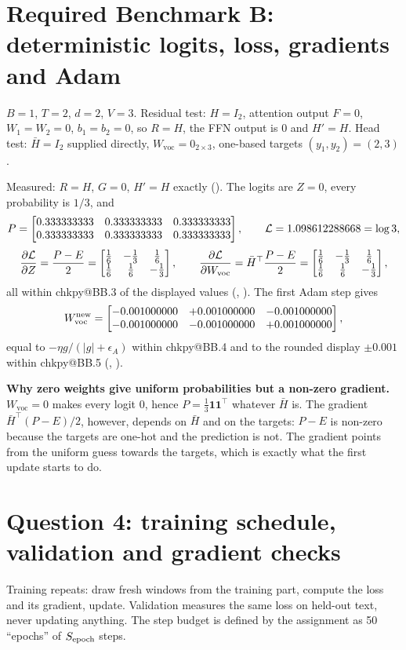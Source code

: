 \documentclass[11pt,a4paper]{article}
\makeatletter
\newcommand{\chkpy}[1]{\csname chkpy@#1\endcsname}
\numberwithin{equation}{section}
\newcommand{\T}{^{\top}}
\newcommand{\one}{\mathbf 1}
\newcommand{\Wvoc}{W_{\mathrm{voc}}}
\newcommand{\Hbar}{\bar H}
\DeclareRobustCommand{\code}[1]{\texttt{\detokenize{#1}}}
\makeatother
\begin{document}
\section{Required Benchmark B: deterministic logits, loss, gradients and Adam}\label{sec:bench}

\begin{purpose}
$B=1$, $T=2$, $d=2$, $V=3$. Residual test: $H=I_2$, attention output $F=0$, $W_1=W_2=0$, $b_1=b_2=0$, so $R=H$, the FFN output
is $0$ and $H'=H$. Head test: $\Hbar=I_2$ supplied directly, $\Wvoc=0_{2\times3}$, one-based targets $(y_1,y_2)=(2,3)$.
\end{purpose}
Measured: $R=H$, $G=0$, $H'=H$ exactly (\code{BB.1}). The logits are $Z=0$, every probability is $1/3$, and
\[
P=\begin{bmatrix}0.333333333 & 0.333333333 & 0.333333333 \\ 0.333333333 & 0.333333333 & 0.333333333\end{bmatrix},\qquad \mathcal L=1.098612288668=\log3,
\]
\[
\frac{\partial\mathcal L}{\partial Z}=\frac{P-E}2=\BenchGZ,\qquad
\frac{\partial\mathcal L}{\partial\Wvoc}=\Hbar\T\frac{P-E}2=\BenchGW ,
\]
all within \chkpy{BB.3} of the displayed values (\code{BB.2}, \code{BB.3}). The first Adam step gives
\[
\Wvoc^{\rm new}=\BenchWnew ,
\]
equal to $-\eta g/(|g|+\epsilon_A)$ within \chkpy{BB.4} and to the rounded display $\pm0.001$ within \chkpy{BB.5}
(\code{BB.4}, \code{BB.5}).

\textbf{Why zero weights give uniform probabilities but a non-zero gradient.} $\Wvoc=0$ makes every logit $0$, hence
$P=\tfrac13\one\one\T$ whatever $\Hbar$ is. The gradient $\Hbar\T(P-E)/2$, however, depends on $\Hbar$ and on the targets:
$P-E$ is non-zero because the targets are one-hot and the prediction is not. The gradient points from the uniform guess
towards the targets, which is exactly what the first update starts to do.

\section{Question 4: training schedule, validation and gradient checks}\label{sec:q4}

\begin{purpose}
Training repeats: draw fresh windows from the training part, compute the loss and its gradient, update. Validation measures
the same loss on held-out text, never updating anything. The step budget is defined by the assignment as 50 ``epochs'' of
$S_{\rm epoch}$ steps.
\end{purpose}
\end{document}
